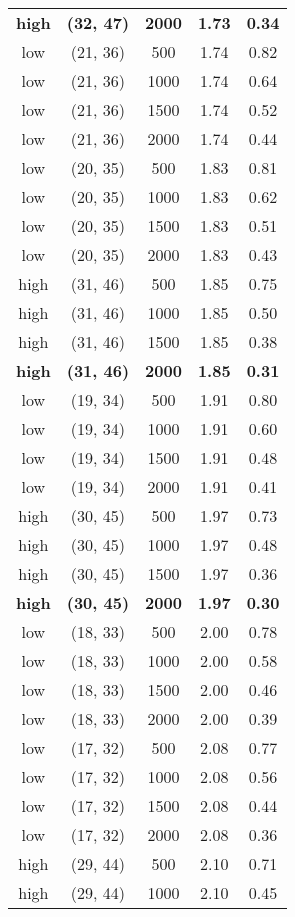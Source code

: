 \begin{tabular}{c c c c c}
\textbf{high} & \textbf{(32, 47)} & \textbf{ 2000} & \textbf{1.73} & \textbf{0.34} \\
low & (21, 36) &  500 & 1.74 & 0.82 \\
low & (21, 36) &  1000 & 1.74 & 0.64 \\
low & (21, 36) &  1500 & 1.74 & 0.52 \\
low & (21, 36) &  2000 & 1.74 & 0.44 \\
low & (20, 35) &  500 & 1.83 & 0.81 \\
low & (20, 35) &  1000 & 1.83 & 0.62 \\
low & (20, 35) &  1500 & 1.83 & 0.51 \\
low & (20, 35) &  2000 & 1.83 & 0.43 \\
high & (31, 46) &  500 & 1.85 & 0.75 \\
high & (31, 46) &  1000 & 1.85 & 0.50 \\
high & (31, 46) &  1500 & 1.85 & 0.38 \\
\textbf{high} & \textbf{(31, 46)} & \textbf{ 2000} & \textbf{1.85} & \textbf{0.31} \\
low & (19, 34) &  500 & 1.91 & 0.80 \\
low & (19, 34) &  1000 & 1.91 & 0.60 \\
low & (19, 34) &  1500 & 1.91 & 0.48 \\
low & (19, 34) &  2000 & 1.91 & 0.41 \\
high & (30, 45) &  500 & 1.97 & 0.73 \\
high & (30, 45) &  1000 & 1.97 & 0.48 \\
high & (30, 45) &  1500 & 1.97 & 0.36 \\
\textbf{high} & \textbf{(30, 45)} & \textbf{ 2000} & \textbf{1.97} & \textbf{0.30} \\
low & (18, 33) &  500 & 2.00 & 0.78 \\
low & (18, 33) &  1000 & 2.00 & 0.58 \\
low & (18, 33) &  1500 & 2.00 & 0.46 \\
low & (18, 33) &  2000 & 2.00 & 0.39 \\
low & (17, 32) &  500 & 2.08 & 0.77 \\
low & (17, 32) &  1000 & 2.08 & 0.56 \\
low & (17, 32) &  1500 & 2.08 & 0.44 \\
low & (17, 32) &  2000 & 2.08 & 0.36 \\
high & (29, 44) &  500 & 2.10 & 0.71 \\
high & (29, 44) &  1000 & 2.10 & 0.45 \\

\end{tabular}
